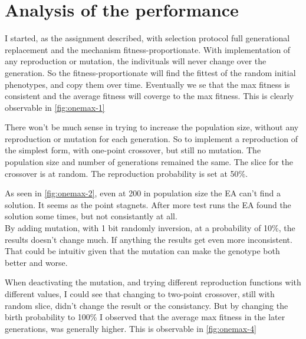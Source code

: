 \section{Analysis of the performance}

I started, as the assignment described, with selection protocol full generational replacement and the mechanism
fitness-proportionate. With implementation of any reproduction or mutation, the indivituals will never change
over the generation. So the fitness-proportionate will find the fittest of the random initial phenotypes, and copy
them over time. Eventually we se that the max fitness is consistent and the average fitness will coverge to the 
max fitness. This is clearly observable in \autoref{fig:onemax-1}


There won't be much sense in trying to increase the population size, without any reproduction or mutation for
each generation. So to implement a reproduction of the simplest form, with one-point crossover, but still no 
mutation. The population size and number of generations remained the same. The slice for the crossover is at
random. The reproduction probability is set at 50\%. 


As seen in \autoref{fig:onemax-2}, even at 200 in population size the EA can't find a solution. It seems as the 
point stagnets. After more test runs the EA found the solution some times, but not consistantly at all. \\

By adding mutation, with 1 bit randomly inversion, at a probability of 10\%, the results doesn't change much. 
If anything the results get even more inconsistent. That could be intuitiv given that the mutation can make
the genotype both better and worse. 


When deactivating the mutation, and trying different reproduction functions with different values, I could see
that changing to two-point crossover, still with random slice, didn't change the result or the consistancy. But
by changing the birth probability to 100\% I observed that the average max fitness in the later generations,
was generally higher. This is observable in \autoref{fig:onemax-4}


